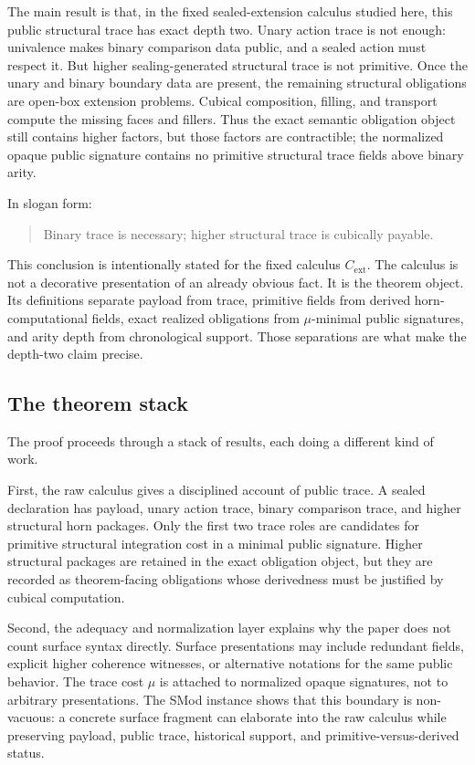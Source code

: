 \documentclass{lmcs}
\begin{document}
The main result is that, in the fixed sealed-extension calculus studied here, this public
structural trace has exact depth two.  Unary action trace is not enough: univalence makes
binary comparison data public, and a sealed action must respect it.  But higher
sealing-generated structural trace is not primitive.  Once the unary and binary boundary data
are present, the remaining structural obligations are open-box extension problems.  Cubical
composition, filling, and transport compute the missing faces and fillers.  Thus the exact
semantic obligation object still contains higher factors, but those factors are contractible;
the normalized opaque public signature contains no primitive structural trace fields above
binary arity.

In slogan form:
\begin{quote}
Binary trace is necessary; higher structural trace is cubically payable.
\end{quote}

This conclusion is intentionally stated for the fixed calculus \(C_{\mathrm{ext}}\).  The
calculus is not a decorative presentation of an already obvious fact.  It is the theorem
object.  Its definitions separate payload from trace, primitive fields from derived
horn-computational fields, exact realized obligations from \(\mu\)-minimal public signatures,
and arity depth from chronological support.  Those separations are what make the depth-two
claim precise.

\subsection{The theorem stack}
\label{subsec:conclusion-theorem-stack}

The proof proceeds through a stack of results, each doing a different kind of work.

First, the raw calculus gives a disciplined account of public trace.  A sealed declaration has
payload, unary action trace, binary comparison trace, and higher structural horn packages.
Only the first two trace roles are candidates for primitive structural integration cost in a
minimal public signature.  Higher structural packages are retained in the exact obligation
object, but they are recorded as theorem-facing obligations whose derivedness must be justified
by cubical computation.

Second, the adequacy and normalization layer explains why the paper does not count surface
syntax directly.  Surface presentations may include redundant fields, explicit higher
coherence witnesses, or alternative notations for the same public behavior.  The trace cost
\(\mu\) is attached to normalized opaque signatures, not to arbitrary presentations.  The SMod
instance shows that this boundary is non-vacuous: a concrete surface fragment can elaborate
into the raw calculus while preserving payload, public trace, historical support, and
primitive-versus-derived status.
\end{document}
